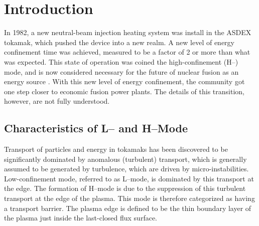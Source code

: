 \chapter{Introduction}\label{chapter:introduction}
In 1982, a new neutral-beam injection heating system was install in the ASDEX tokamak, which pushed the device into a new realm.
A new level of energy confinement time was achieved, measured to be a factor of 2 or more than what was expected.
This state of operation was coined the high-confinement (H--) mode, and is now considered necessary for the future of nuclear fusion as an energy source \cite{arnoux_how_2009, wagner_development_1984}.
With this new level of energy confinement, the community got one step closer to economic fusion power plants.
The details of this transition, however, are not fully understood.

\section{Characteristics of L-- and H--Mode}\label{sec:characteristics}
Transport of particles and energy in tokamaks has been discovered to be significantly dominated by anomalous (turbulent) transport, which is generally assumed to be generated by turbulence, which are driven by micro-instabilities.
Low-confinement mode, referred to as L--mode, is dominated by this transport at the edge.
The formation of H--mode is due to the suppression of this turbulent transport at the edge of the plasma.
This mode is therefore categorized as having a transport barrier.
The plasma edge is defined to be the thin boundary layer of the plasma just inside the last-closed flux surface.

